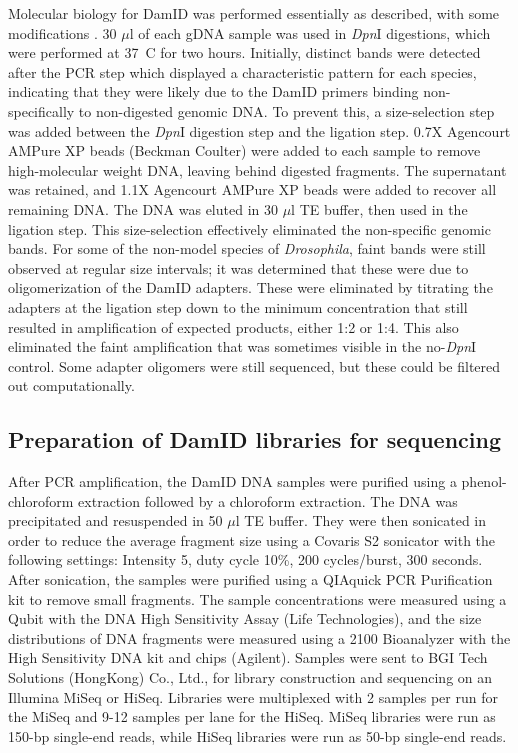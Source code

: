Molecular biology for DamID was performed essentially as described, with some modifications \citep{vogel_detection_2007}. 30 \(\mu\)l of each gDNA sample was used in \emph{Dpn}I digestions, which were performed at 37\degree~C for two hours. Initially, distinct bands were detected after the PCR step which displayed a characteristic pattern for each species, indicating that they were likely due to the DamID primers binding non-specifically to non-digested genomic DNA. To prevent this, a size-selection step was added between the \emph{Dpn}I digestion step and the ligation step. 0.7X Agencourt AMPure XP beads (Beckman Coulter) were added to each sample to remove high-molecular weight DNA, leaving behind digested fragments. The supernatant was retained, and 1.1X Agencourt AMPure XP beads were added to recover all remaining DNA. The DNA was eluted in 30 \(\mu\)l TE buffer, then used in the ligation step. This size-selection effectively eliminated the non-specific genomic bands. For some of the non-model species of \emph{Drosophila}, faint bands were still observed at regular size intervals; it was determined that these were due to oligomerization of the DamID adapters. These were eliminated by titrating the adapters at the ligation step down to the minimum concentration that still resulted in amplification of expected products, either 1:2 or 1:4. This also eliminated the faint amplification that was sometimes visible in the no-\emph{Dpn}I control. Some adapter oligomers were still sequenced, but these could be filtered out computationally.  

\subsection{Preparation of DamID libraries for sequencing}
After PCR amplification, the DamID DNA samples were purified using a phenol-chloroform extraction followed by a chloroform extraction. The DNA was precipitated and resuspended in 50 \(\mu\)l TE buffer. They were then sonicated in order to reduce the average fragment size using a Covaris S2 sonicator with the following settings: Intensity 5, duty cycle 10\%, 200 cycles/burst, 300 seconds. After sonication, the samples were purified using a QIAquick PCR Purification kit to remove small fragments. The sample concentrations were measured using a Qubit with the DNA High Sensitivity Assay (Life Technologies), and the size distributions of DNA fragments were measured using a 2100 Bioanalyzer with the High Sensitivity DNA kit and chips (Agilent). Samples were sent to BGI Tech Solutions (HongKong) Co., Ltd., for library construction and sequencing on an Illumina MiSeq or HiSeq. Libraries were multiplexed with 2 samples per run for the MiSeq and 9-12 samples per lane for the HiSeq. MiSeq libraries were run as 150-bp single-end reads, while HiSeq libraries were run as 50-bp single-end reads. 

